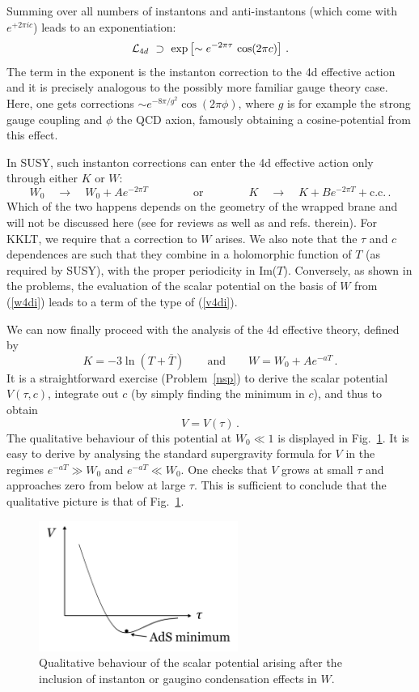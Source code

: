 \documentclass[12pt]{article}
\newcommand{\be}{\begin{equation}}
\newcommand{\ee}{\end{equation}}
\numberwithin{equation}{section}
\begin{document}
Summing over all numbers of instantons and anti-instantons (which come with $e^{+2\pi i c}$) leads to an exponentiation:
\be
{\cal L}_{4d}\,\,\supset\,\,\exp\left[ \sim e^{-2\pi \tau}\,\cos(2\pi c)\right]\,.\label{v4di}
\ee
The term in the exponent is the instanton correction to the 4d effective action and it is precisely analogous to the possibly more familiar gauge theory case. Here, one gets corrections $\sim e^{-8\pi/g^2}\cos(2\pi\phi)$, where $g$ is for example the strong gauge coupling and $\phi$ the QCD axion, famously obtaining a cosine-potential from this effect. 

In SUSY, such instanton corrections can enter the 4d effective action only through either $K$ or $W$:
\be
W_0\quad\to\quad W_0+Ae^{-2\pi T}\qquad\qquad\mbox{or}\qquad\qquad 
K\quad\to\quad K+B e^{-2\pi T}+\mbox{c.c.}\,.\label{w4di}
\ee
Which of the two happens depends on the geometry of the wrapped brane and will not be discussed here \cite{Witten:1996bn} (see \cite{Blumenhagen:2009qh, Bianchi:2007ft} for reviews as well as \cite{Bianchi:2011qh, Palti:2020qlc} and refs. therein). For KKLT, we require that a correction to $W$ arises. We also note that the $\tau$ and $c$ dependences are such that they combine in a holomorphic function of $T$ (as required by SUSY), with the proper periodicity in Im($T$). Conversely, as shown in the problems, the evaluation of the scalar potential on the basis of $W$ from (\ref{w4di}) leads to a term of the type of (\ref{v4di}). 

We can now finally proceed with the analysis of the 4d effective theory, defined by 
\be
K=-3\ln(T+\overline{T})\qquad \mbox{and}\qquad W=W_0+Ae^{-aT}\,.
\ee
It is a straightforward exercise (Problem~\ref{nsp}) to derive the scalar potential $V(\tau,c)$, integrate out $c$ (by simply finding the minimum in $c$), and thus to obtain
\be
V=V(\tau)\,.
\ee
The qualitative behaviour of this potential at $W_0\ll 1$ is displayed in Fig.~\ref{kkltads}. It is easy to derive by analysing the standard supergravity formula for $V$ in the regimes $e^{-aT}\gg W_0$ and $e^{-aT}\ll W_0$. One checks that $V$ grows at small $\tau$ and approaches zero from below at large $\tau$. This is sufficient to conclude that the qualitative picture is that of Fig.~\ref{kkltads}.

\begin{figure}[ht]
\begin{center} 
\includegraphics[width=6.5cm]{kkltads.png}
\caption{Qualitative behaviour of the scalar potential arising after the inclusion of instanton or gaugino condensation effects in $W$.}
\label{kkltads} 
\end{center}
\end{figure}
\end{document}
